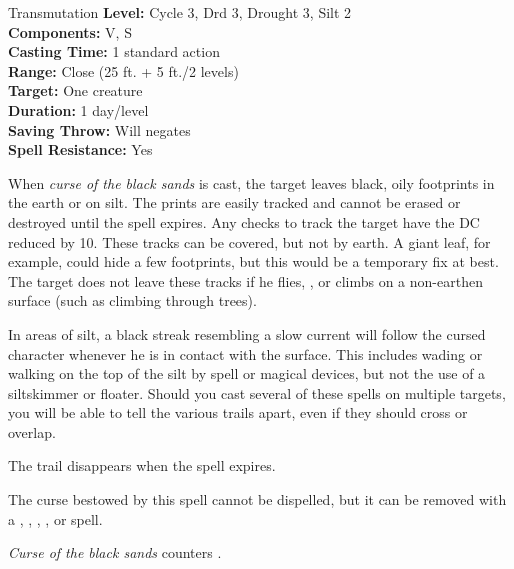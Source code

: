 {Transmutation}
{
	\textbf{Level:}
	Cycle 3, Drd 3, Drought 3, Silt 2\\
	\textbf{Components:}
	V, S\\
	\textbf{Casting Time:}
	1 standard action\\
	\textbf{Range:}
	Close (25 ft. + 5 ft./2 levels)\\
	\textbf{Target:}
	One creature\\
	\textbf{Duration:}
	1 day/level\\
	\textbf{Saving Throw:}
	Will negates\\
	\textbf{Spell Resistance:}
	Yes\\
}
{
	When \emph{curse of the black sands} is cast, the target leaves black, oily footprints in the earth or on silt. The prints are easily tracked and cannot be erased or destroyed until the spell expires. Any  checks to track the target have the DC reduced by 10. These tracks can be covered, but not by earth. A giant leaf, for example, could hide a few footprints, but this would be a temporary fix at best. The target does not leave these tracks if he flies, , or climbs on a non-earthen surface (such as climbing through trees).

	In areas of silt, a black streak resembling a slow current will follow the cursed character whenever he is in contact with the surface. This includes wading or walking on the top of the silt by spell or magical devices, but not the use of a siltskimmer or floater. Should you cast several of these spells on multiple targets, you will be able to tell the various trails apart, even if they should cross or overlap.

	The trail disappears when the spell expires.

	The curse bestowed by this spell cannot be dispelled, but it can be removed with a , , , , or  spell.

	\emph{Curse of the black sands} counters .
}
